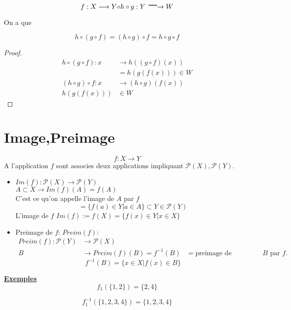 \documentclass[../main.tex]{subfiles}
\begin{document}
\[ 
	f: X \longrightarrow Y \huge{\circ} h \circ g : Y \longrightarrow W
\]

On a que 

\begin{thm}\label{thm:composition_de_fonctions}
	
\[ 
	h \circ ( g \circ f) = ( h \circ g) \circ f = h \circ g \circ f
\]
\end{thm}
\begin{proof}
	\begin{align*}
		h \circ ( g \circ f) : x &\longrightarrow h((g\circ f) ( x))\\
	&= h(g(f(x))) \in W\\
		( h\circ g) \circ f : x &\longrightarrow ( h\circ g) ( f(x))\\
		h(g(f(x))) &\in W
	\end{align*}



\end{proof}
\section{Image,Preimage}
\[ 
f: X \longrightarrow Y
\]
A l'application $f$ sont associes deux applications impliquant $\mathcal{P}(X), \mathcal{P}(Y)$.
\begin{itemize}
	\item $Im(f): \mathcal{P}(X) \longrightarrow \mathcal{P}(Y)$\\
		$A \subset X  \longrightarrow  Im(f)(A)=f(A)$\\
		C'est ce qu'on appelle l'image de $A$ par $f$ 
		\[ 
			= \{ f(a) \in Y \vert a \in A\} \subset Y \in \mathcal{P}(Y)
		\]
		L'image de $f$ $Im(f) := f(X) = \{f(x) \in Y \vert x \in X\}$

	\item Preimage de  $f$: $Preim(f)$:
		\begin{align*}
			Preim(f): \mathcal{P}(Y) &\longrightarrow \mathcal{P}(X)\\
			B &\longrightarrow Preim(f)(B) = f^{-1}(B)
			  &= \text{preimage de l'ensemble $B$ par $f$.}
		\end{align*}
		\[ 
			f^{-1}(B) = \{x \in X \vert f(x) \in B\}
		\]
\end{itemize}

\textbf{\underline{Exemples}}\\

\[ 
	f_1(\{1,2\}) = \{2,4\}
\]

\[ 
	f_1^{-1}(\{1,2,3,4\}) = \{1,2,3,4\}
\]
\end{document}
